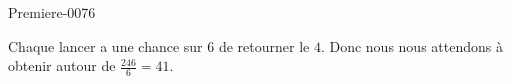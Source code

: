
\begin{corrige}{Premiere-0076}

    Chaque lancer a une chance sur \( 6\) de retourner le \( 4\). Donc nous nous attendons à obtenir autour de \( \frac{ 246 }{ 6 }=41\).

\end{corrige}
